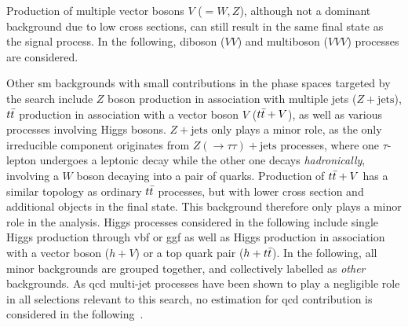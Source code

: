Production of multiple vector bosons $V$ ($=W,Z$), although not a dominant background due to low cross sections, can still result in the same final state as the signal process.
In the following, diboson ($VV$) and multiboson ($VVV$) processes are considered.

Other \gls{sm} backgrounds with small contributions in the phase spaces targeted by the search include $Z$ boson production in association with multiple jets ($Z+\mathrm{jets}$), $t\bar{t}$ production in association with a vector boson $V$ ($t\bar{t}+V$), as well as various processes involving Higgs bosons.
$Z+\mathrm{jets}$ only plays a minor role, as the only irreducible component originates from $Z(\rightarrow\tau\tau)+\mathrm{jets}$ processes, where one $\tau$-lepton undergoes a leptonic decay while the other one decays \textit{hadronically}, \ie involving a $W$ boson decaying into a pair of quarks.
Production of $t\bar{t}+V$ has a similar topology as ordinary $t\bar{t}$ processes, but with lower cross section and additional objects in the final state. This background therefore only plays a minor role in the analysis.
Higgs processes considered in the following include single Higgs production through \gls{vbf} or \gls{ggf} as well as Higgs production in association with a vector boson ($h+V$) or a top quark pair ($h+t\bar{t}$).
In the following, all minor backgrounds are grouped together, and collectively labelled as \textit{other} backgrounds. 
As \gls{qcd} multi-jet processes have been shown to play a negligible role in all selections relevant to this search, no estimation for \gls{qcd} contribution is considered in the following~\cite{SUSY-2019-08}.

